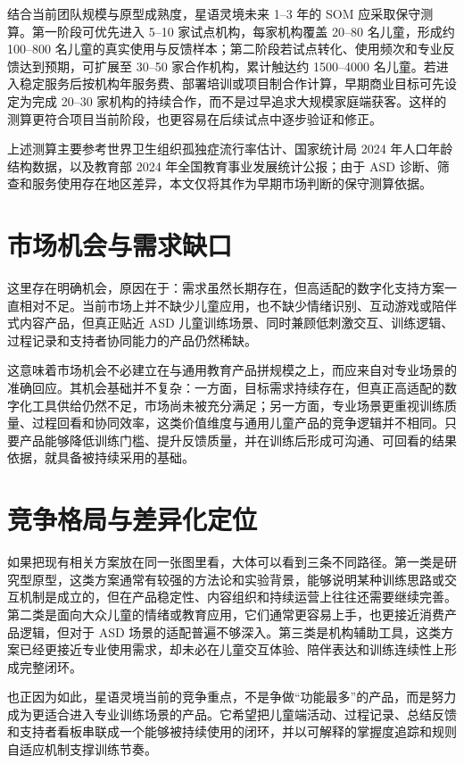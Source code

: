 结合当前团队规模与原型成熟度，星语灵境未来 1--3 年的 SOM 应采取保守测算。第一阶段可优先进入 5--10 家试点机构，每家机构覆盖 20--80 名儿童，形成约 100--800 名儿童的真实使用与反馈样本；第二阶段若试点转化、使用频次和专业反馈达到预期，可扩展至 30--50 家合作机构，累计触达约 1500--4000 名儿童。若进入稳定服务后按机构年服务费、部署培训或项目制合作计算，早期商业目标可先设定为完成 20--30 家机构的持续合作，而不是过早追求大规模家庭端获客。这样的测算更符合项目当前阶段，也更容易在后续试点中逐步验证和修正。

上述测算主要参考世界卫生组织孤独症流行率估计、国家统计局 2024 年人口年龄结构数据，以及教育部 2024 年全国教育事业发展统计公报；由于 ASD 诊断、筛查和服务使用存在地区差异，本文仅将其作为早期市场判断的保守测算依据。

\section{市场机会与需求缺口}
这里存在明确机会，原因在于：需求虽然长期存在，但高适配的数字化支持方案一直相对不足。当前市场上并不缺少儿童应用，也不缺少情绪识别、互动游戏或陪伴式内容产品，但真正贴近 ASD 儿童训练场景、同时兼顾低刺激交互、训练逻辑、过程记录和支持者协同能力的产品仍然稀缺。

这意味着市场机会不必建立在与通用教育产品拼规模之上，而应来自对专业场景的准确回应。其机会基础并不复杂：一方面，目标需求持续存在，但真正高适配的数字化工具供给仍然不足，市场尚未被充分满足；另一方面，专业场景更重视训练质量、过程回看和协同效率，这类价值维度与通用儿童产品的竞争逻辑并不相同。只要产品能够降低训练门槛、提升反馈质量，并在训练后形成可沟通、可回看的结果依据，就具备被持续采用的基础。

\section{竞争格局与差异化定位}
如果把现有相关方案放在同一张图里看，大体可以看到三条不同路径。第一类是研究型原型，这类方案通常有较强的方法论和实验背景，能够说明某种训练思路或交互机制是成立的，但在产品稳定性、内容组织和持续运营上往往还需要继续完善。第二类是面向大众儿童的情绪或教育应用，它们通常更容易上手，也更接近消费产品逻辑，但对于 ASD 场景的适配普遍不够深入。第三类是机构辅助工具，这类方案已经更接近专业使用需求，却未必在儿童交互体验、陪伴表达和训练连续性上形成完整闭环。

也正因为如此，星语灵境当前的竞争重点，不是争做“功能最多”的产品，而是努力成为更适合进入专业训练场景的产品。它希望把儿童端活动、过程记录、总结反馈和支持者看板串联成一个能够被持续使用的闭环，并以可解释的掌握度追踪和规则自适应机制支撑训练节奏。

